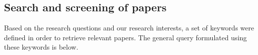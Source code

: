 \subsection{Search and screening of papers} \label{subsec:search}

Based on the research questions and our research interests, a set of keywords were defined in order to 
retrieve relevant papers.
The general query formulated using these keywords is below.
\medskip

